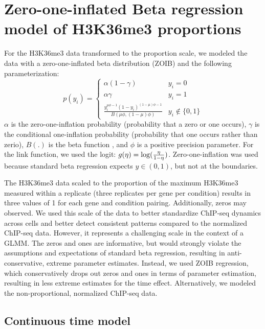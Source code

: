 \documentclass[12pt]{extarticle}
\begin{document}
\section*{Zero-one-inflated Beta regression model of H3K36me3 proportions}
For the H3K36me3 data transformed to the proportion scale, we modeled the data with a zero-one-inflated beta distribution (ZOIB) and the following parameterization:
\begin{equation}
	p(y_{i}) = \begin{cases} 
      			\alpha(1 - \gamma) & y_{i} = 0 \\
      			\alpha \gamma & y_{i} = 1 \\
     			 \frac{y_{i}^{\mu\phi - 1}(1 - y_{i})^{(1 - \mu)\phi - 1}}{B(\mu \phi, (1 - \mu)\phi)} & y_{i} \not\in \{0, 1\}
   		\end{cases}
\end{equation}
$\alpha$ is the zero-one-inflation probability (probability that a zero or one occurs), $\gamma$ is the conditional one-inflation probability (probability that one occurs rather than zerio), $B(.)$ is the beta function \cite{Casella2002}, and $\phi$ is a positive precision parameter. For the link function, we used the logit: $g(\eta)= \log\large(\frac{\eta}{1 - \eta}\large)$. Zero-one-inflation was used because standard beta regression expects $y \in (0, 1)$, but not at the boundaries.

The H3K36me3 data scaled to the proportion of the maximum H3K36me3 measured within a replicate (three replicates per gene per condition) results in three values of 1 for each gene and condition pairing. Additionally, zeros may observed. We used this scale of the data to better standardize ChIP-seq dynamics across cells and better detect consistent patterns compared to the normalized ChIP-seq data. However, it represents a challenging scale in the context of a GLMM. The zeros and ones are informative, but would strongly violate the assumptions and expectations of standard beta regression, resulting in anti-conservative, extreme parameter estimates. Instead, we used ZOIB regression, which conservatively drops out zeros and ones in terms of parameter estimation, resulting in less extreme estimates for the time effect. Alternatively, we modeled the non-proportional, normalized ChIP-seq data.

\subsection*{Continuous time model}
\end{document}
